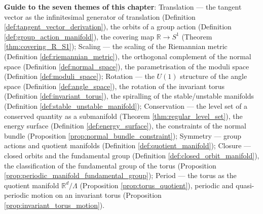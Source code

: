 \begin{remark}
\textbf{Guide to the seven themes of this chapter}: Translation --- the tangent vector as the infinitesimal generator of translation (Definition \ref{def:tangent_vector_derivation}), the orbits of a group action (Definition \ref{def:group_action_manifold}), the covering map $\mathbb{R} \to S^1$ (Theorem \ref{thm:covering_R_S1}); Scaling --- the scaling of the Riemannian metric (Definition \ref{def:riemannian_metric}), the orthogonal complement of the normal space (Definition \ref{def:normal_space}), the parametrisation of the moduli space (Definition \ref{def:moduli_space}); Rotation --- the $U(1)$ structure of the angle space (Definition \ref{def:angle_space}), the rotation of the invariant torus (Definition \ref{def:invariant_torus}), the spiralling of the stable/unstable manifolds (Definition \ref{def:stable_unstable_manifold}); Conservation --- the level set of a conserved quantity as a submanifold (Theorem \ref{thm:regular_level_set}), the energy surface (Definition \ref{def:energy_surface}), the constraints of the normal bundle (Proposition \ref{prop:normal_bundle_constraint}); Symmetry --- group actions and quotient manifolds (Definition \ref{def:quotient_manifold}); Closure --- closed orbits and the fundamental group (Definition \ref{def:closed_orbit_manifold}), the classification of the fundamental group of the torus (Proposition \ref{prop:periodic_manifold_fundamental_group}); Period --- the torus as the quotient manifold $\mathbb{R}^d/\Lambda$ (Proposition \ref{prop:torus_quotient}), periodic and quasi-periodic motion on an invariant torus (Proposition \ref{prop:invariant_torus_motion}).
\end{remark}

